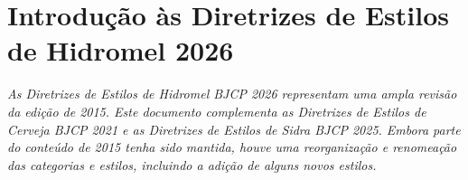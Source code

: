 \section*{Introdução às Diretrizes de Estilos de Hidromel 2026}


\textit{As Diretrizes de Estilos de Hidromel BJCP 2026 representam uma ampla revisão da edição de 2015. Este documento complementa as Diretrizes de Estilos de Cerveja BJCP 2021 e as Diretrizes de Estilos de Sidra BJCP 2025. Embora parte do conteúdo de 2015 tenha sido mantida, houve uma reorganização e renomeação das categorias e estilos, incluindo a adição de alguns novos estilos.}